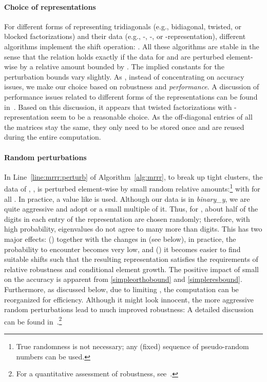 \documentclass[final]{siamltex}
\newcommand{\binaryy}{{\it binary\_\hspace*{0pt}y}}
\begin{document}
\paragraph{Choice of representations} For different forms
of representing tridiagonals (e.g., bidiagonal, twisted, or blocked factorizations) and their
data (e.g., -, -, or -representation), different algorithms
implement the shift operation: . All these
algorithms are stable in the sense that the relation holds 
exactly if the data for  and  are perturbed element-wise by a
relative amount bounded by . The implied constants
for the perturbation bounds vary slightly. As , instead of concentrating on accuracy issues, we make our
choice based on robustness and {\it performance}. A discussion of performance
issues related to different forms of the representations can be found
in~\cite{Willems:twisted,Willems:Diss}. Based on this discussion, it appears
that twisted factorizations with -representation seem to be a reasonable
choice. As the off-diagonal entries of all the matrices stay the same, they
only need to be stored once and are reused during the entire
computation. 

\paragraph{Random perturbations} In Line~\ref{line:mrrr:perturb} of
Algorithm~\ref{alg:mrrr}, to break up tight clusters, the data of 
, , is perturbed element-wise by small
random relative amounts:\footnote{True randomness is not necessary; any
  (fixed) sequence of pseudo-random numbers can be used.} 
 with  for all . In practice, a value like  is used. Although our data is in \binaryy, we are quite
aggressive and adopt  or a small multiple
of it. Thus, for , about half of the digits in each entry of the representation are chosen
randomly; therefore, with high probability, eigenvalues do not agree to
many more than  digits.
This has two major effects: () together with the changes in
 (see below), in practice, the probability to encounter  
becomes very low, and () it becomes easier to find suitable shifts such that the
resulting representation satisfies the requirements of relative robustness
and conditional element growth. The positive impact of small 
 on the accuracy is apparent from \eqref{simpleorthobound}
and \eqref{simpleresbound}. Furthermore, as 
discussed below, due to limiting , the computation can be
reorganized for efficiency. Although it might look innocent, the more
aggressive random perturbations lead to much improved robustness: A detailed
discussion can be found in~\cite{Dhillon05gluedmatrices}.\footnote{For a quantitative
  assessment of robustness, see~\cite{mydiss}.} 
\end{document}
